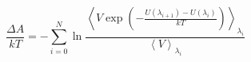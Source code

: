 


\[ \frac{\Delta A}{kT} = - \sum_{i=0}^N \ln \frac{\left< V \exp \left( -
    \frac{U(\lambda_{i+1}) - U(\lambda_i)}{kT} \right)
\right>_{\lambda_i}}{\left< V \right>_{\lambda_i}} \]


